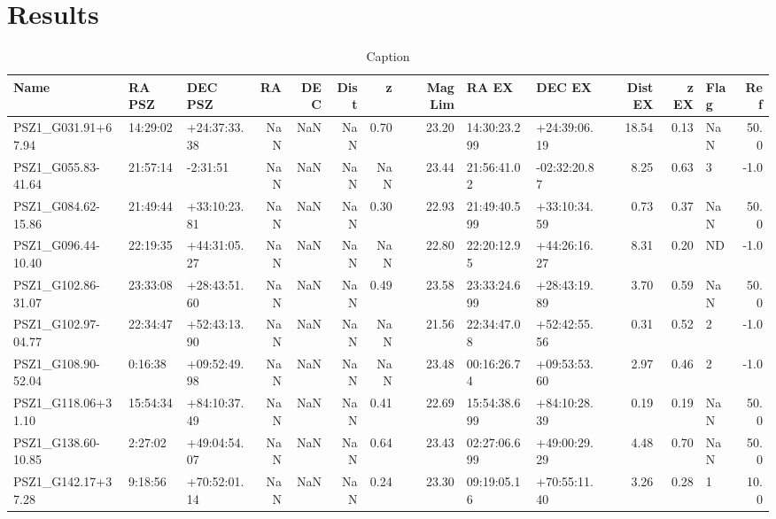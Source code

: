 \documentclass[apj, revtex4]{emulateapj}
\begin{document}
\section{Results}\label{sec:results}

\begin{table}
	\caption[Caption]{Caption}

	\tiny
\begin{tabular}{lllrrrrrllrrlr}
	\hline
	Name &    RA PSZ &       DEC PSZ &  RA &  DEC &  Dist &    z &  Mag Lim &         RA EX &        DEC EX &  Dist EX &  z EX & Flag &   Ref \\
	\hline
 PSZ1\_G031.91+67.94 &  14:29:02 &  +24:37:33.38 & NaN &  NaN &   NaN & 0.70 &    23.20 &  14:30:23.299 &  +24:39:06.19 &    18.54 &  0.13 &  NaN &  50.0 \\
 PSZ1\_G055.83-41.64 &  21:57:14 &      -2:31:51 & NaN &  NaN &   NaN & NaN &    23.44 &   21:56:41.02 &  -02:32:20.87 &     8.25 &  0.63 &    3 &  -1.0 \\
 PSZ1\_G084.62-15.86 &  21:49:44 &  +33:10:23.81 & NaN &  NaN &   NaN & 0.30 &    22.93 &  21:49:40.599 &  +33:10:34.59 &     0.73 &  0.37 &  NaN &  50.0 \\
 PSZ1\_G096.44-10.40 &  22:19:35 &  +44:31:05.27 & NaN &  NaN &   NaN & NaN &    22.80 &   22:20:12.95 &  +44:26:16.27 &     8.31 &  0.20 &   ND &  -1.0 \\
 PSZ1\_G102.86-31.07 &  23:33:08 &  +28:43:51.60 & NaN &  NaN &   NaN & 0.49 &    23.58 &  23:33:24.699 &  +28:43:19.89 &     3.70 &  0.59 &  NaN &  50.0 \\
 PSZ1\_G102.97-04.77 &  22:34:47 &  +52:43:13.90 & NaN &  NaN &   NaN & NaN &    21.56 &   22:34:47.08 &  +52:42:55.56 &     0.31 &  0.52 &    2 &  -1.0 \\
 PSZ1\_G108.90-52.04 &   0:16:38 &  +09:52:49.98 & NaN &  NaN &   NaN &  NaN &    23.48 &   00:16:26.74 &  +09:53:53.60 &     2.97 &  0.46 &    2 &  -1.0 \\
 PSZ1\_G118.06+31.10 &  15:54:34 &  +84:10:37.49 & NaN &  NaN &   NaN & 0.41 &    22.69 &  15:54:38.699 &  +84:10:28.39 &     0.19 &  0.19 &  NaN &  50.0 \\
 PSZ1\_G138.60-10.85 &   2:27:02 &  +49:04:54.07 & NaN &  NaN &   NaN & 0.64 &    23.43 &  02:27:06.699 &  +49:00:29.29 &     4.48 &  0.70 &  NaN &  50.0 \\
 PSZ1\_G142.17+37.28 &   9:18:56 &  +70:52:01.14 & NaN &  NaN &   NaN & 0.24 &    23.30 &   09:19:05.16 &  +70:55:11.40 &     3.26 &  0.28 &    1 &  10.0 \\

\end{tabular}
\end{table}
\end{document}
